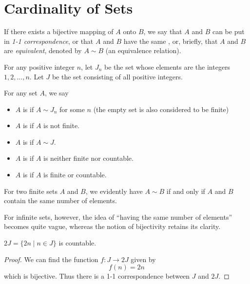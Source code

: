\section{Cardinality of Sets}
\begin{definition}
If there exists a bijective mapping of $A$ onto $B$, we say that $A$ and $B$ can be put in \emph{1-1 correspondence}, or that $A$ and $B$ have the same , or, briefly, that $A$ and $B$ are \emph{equivalent}, denoted by $A\sim B$ (an equivalence relation). 
\end{definition}

\begin{notation}
For any positive integer $n$, let $J_n$ be the set whose elements are the integers $1,2,\dots,n$. Let $J$ be the set consisting of all positive integers. 
\end{notation}

\begin{definition}
For any set $A$, we say
\begin{itemize}
\item $A$ is  if $A\sim J_n$ for some $n$ (the empty set is also considered to be finite)
\item $A$ is  if $A$ is not finite.
\item $A$ is  if $A\sim J$.
\item $A$ is  if $A$ is neither finite nor countable.
\item $A$ is  if $A$ is finite or countable.
\end{itemize}
\end{definition}

For two finite sets $A$ and $B$, we evidently have $A\sim B$ if and only if $A$ and $B$ contain the same number of elements.

For infinite sets, however, the idea of ``having the same number of elements'' becomes quite vague, whereas the notion of bijectivity retains its clarity.

\begin{proposition}
$2J=\{2n\mid n\in J\}$ is countable.
\end{proposition}

\begin{proof}
We can find the function $f:J\to2J$ given by 
\[f(n)=2n\]
which is bijective. Thus there is a 1-1 correspondence between $J$ and $2J$.
\end{proof}

